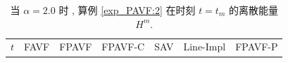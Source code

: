 
\begin{table}[H]\footnotesize
	\centering
	\caption{当 $\alpha=2.0$ 时 , 算例 \ref{exp_PAVF:2}  在时刻 $t=t_{m}$ 的离散能量 $H^{m}$.}

	  \begin{tabular}{lllllll}
	  \toprule
       $t$   &FAVF   &FPAVF   &FPAVF-C   &SAV    &Line-Impl   &FPAVF-P\\

\end{tabular}
\end{table}
